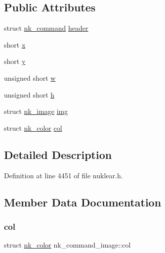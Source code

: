 \subsection*{Public Attributes}
\begin{DoxyCompactItemize}
\item 
struct \mbox{\hyperlink{structnk__command}{nk\+\_\+command}} \mbox{\hyperlink{structnk__command__image_a7f6037a268632506b1de92d2a16e9c5c}{header}}
\item 
short \mbox{\hyperlink{structnk__command__image_aaaf990c35a61ed7fe29a292d85eb636c}{x}}
\item 
short \mbox{\hyperlink{structnk__command__image_a918d37c9a97ec8ef3541fc611da83264}{y}}
\item 
unsigned short \mbox{\hyperlink{structnk__command__image_aa1dc36e2ba784ad28bcb341a3494f549}{w}}
\item 
unsigned short \mbox{\hyperlink{structnk__command__image_a366459669a34bc07fcb2b66d01159ebf}{h}}
\item 
struct \mbox{\hyperlink{structnk__image}{nk\+\_\+image}} \mbox{\hyperlink{structnk__command__image_ac95060c32a20e739a464fb40234282fa}{img}}
\item 
struct \mbox{\hyperlink{structnk__color}{nk\+\_\+color}} \mbox{\hyperlink{structnk__command__image_a2d98223c2a444c2916b05c01986fca8d}{col}}
\end{DoxyCompactItemize}


\subsection{Detailed Description}


Definition at line 4451 of file nuklear.\+h.



\subsection{Member Data Documentation}
\mbox{\label{structnk__command__image_a2d98223c2a444c2916b05c01986fca8d}} 
\subsubsection{\texorpdfstring{col}{col}}
{\footnotesize\ttfamily struct \mbox{\hyperlink{structnk__color}{nk\+\_\+color}} nk\+\_\+command\+\_\+image\+::col}



